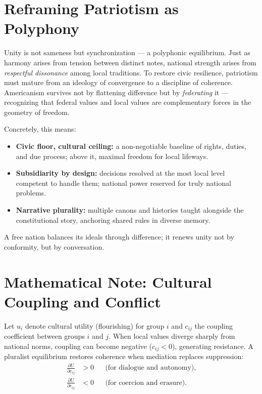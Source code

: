 \documentclass[12pt,twoside]{book}
\begin{document}
\section{Reframing Patriotism as Polyphony}

Unity is not sameness but synchronization — a polyphonic equilibrium.  
Just as harmony arises from tension between distinct notes, national strength arises from \emph{respectful dissonance} among local traditions.  
To restore civic resilience, patriotism must mature from an ideology of convergence to a discipline of coherence.  
Americanism survives not by flattening difference but by \emph{federating} it — recognizing that federal values and local values are complementary forces in the geometry of freedom.

Concretely, this means:
\begin{itemize}
  \item \textbf{Civic floor, cultural ceiling:} a non-negotiable baseline of rights, duties, and due process; above it, maximal freedom for local lifeways.
  \item \textbf{Subsidiarity by design:} decisions resolved at the most local level competent to handle them; national power reserved for truly national problems.
  \item \textbf{Narrative plurality:} multiple canons and histories taught alongside the constitutional story, anchoring shared rules in diverse memory. \\
\end{itemize}

\begin{keyidea}
A free nation balances its ideals through difference; it renews unity not by conformity, but by conversation.
\end{keyidea}

\section{Mathematical Note: Cultural Coupling and Conflict}

Let $u_i$ denote cultural utility (flourishing) for group $i$ and $c_{ij}$ the coupling coefficient between groups $i$ and $j$.  
When local values diverge sharply from national norms, coupling can become negative ($c_{ij}<0$), generating resistance.  
A pluralist equilibrium restores coherence when mediation replaces suppression: 
\[
\begin{aligned}
\frac{\partial U}{\partial c_{ij}} &> 0 
&&\text{(for dialogue and autonomy)},\\[4pt]
\frac{\partial U}{\partial c_{ij}} &< 0 
&&\text{(for coercion and erasure).}
\end{aligned}
\]
\end{document}
